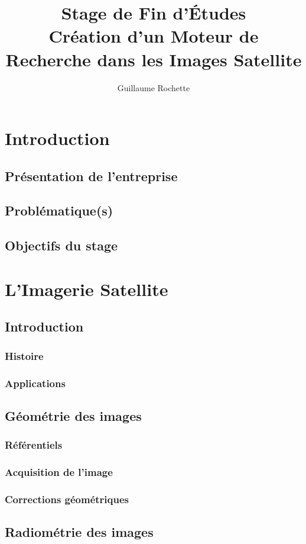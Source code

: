 \documentclass[10pt,a4paper]{report}
\author{Guillaume Rochette}
\title{Stage de Fin d'Études\\
Création d'un Moteur de Recherche dans les Images Satellite}
\begin{document}
	\maketitle
	\tableofcontents
	
	\chapter{Introduction}
		\section{Présentation de l'entreprise}
		\section{Problématique(s)}
		\section{Objectifs du stage}
	\chapter{L'Imagerie Satellite}
		\section{Introduction}
			\subsection{Histoire}
			\subsection{Applications}
		\section{Géométrie des images}
			\subsection{Référentiels}
			\subsection{Acquisition de l'image}
			\subsection{Corrections géométriques}
		\section{Radiométrie des images}
\end{document}

